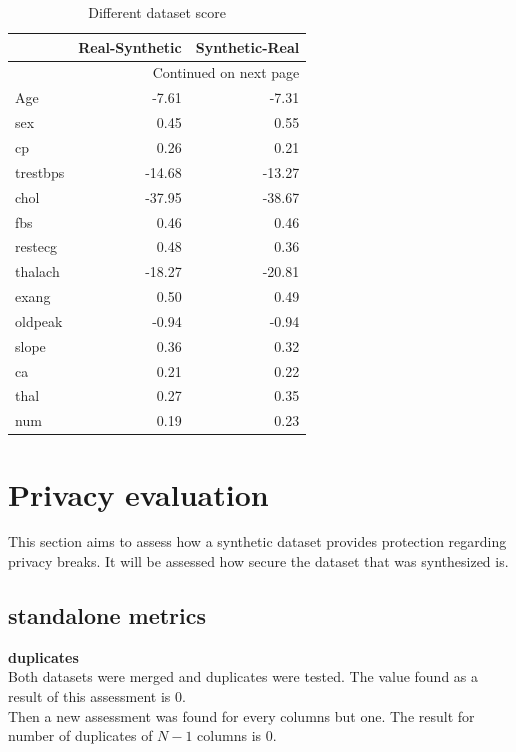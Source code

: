 \documentclass{article}
\begin{document}
\begin{longtable}{lrr}
\caption{Different dataset score}\label{tab:difdatascore}\\
\toprule
{} &  Real-Synthetic &  Synthetic-Real \\
\midrule
\endhead
\midrule
\multicolumn{3}{r}{{Continued on next page}} \\
\midrule
\endfoot

\bottomrule
\endlastfoot
Age      &           -7.61 &           -7.31 \\
sex      &            0.45 &            0.55 \\
cp       &            0.26 &            0.21 \\
trestbps &          -14.68 &          -13.27 \\
chol     &          -37.95 &          -38.67 \\
fbs      &            0.46 &            0.46 \\
restecg  &            0.48 &            0.36 \\
thalach  &          -18.27 &          -20.81 \\
exang    &            0.50 &            0.49 \\
oldpeak  &           -0.94 &           -0.94 \\
slope    &            0.36 &            0.32 \\
ca       &            0.21 &            0.22 \\
thal     &            0.27 &            0.35 \\
num      &            0.19 &            0.23 \\
\end{longtable}



\section{Privacy evaluation}
This section aims to assess how a synthetic dataset provides protection regarding privacy breaks. It will be assessed how secure the dataset that was synthesized is.
\subsection{standalone metrics}
\textbf{duplicates}\\

Both datasets were merged and duplicates were tested. The value found as a result of this assessment is 0.\\
Then a new assessment was found for every columns but one. The result for number of duplicates of $N-1$ columns is 0. 
\end{document}
